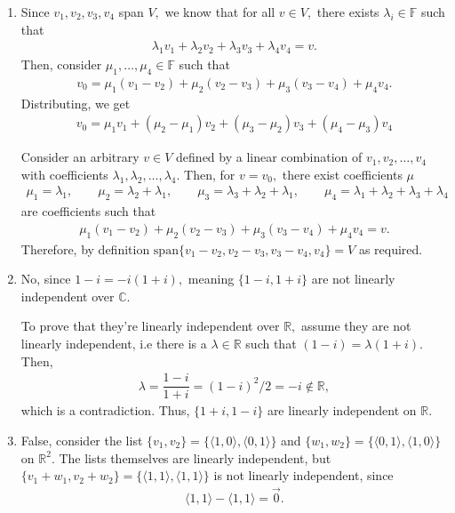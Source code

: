 \documentclass[12pt]{article}
\begin{document}
\begin{enumerate}
  \item Since $v_1, v_2, v_3, v_4$ span $V,$ we know that for all $v
    \in V,$ there exists $\lambda_i \in \mathbb F$ such that
    \begin{align*}
      \lambda_1 v_1 + \lambda_2 v_2 + \lambda_3 v_3 + \lambda_4 v_4 = v.
    \end{align*}
    Then, consider $\mu_1, \ldots, \mu_4 \in \mathbb F$ such that
    \begin{align*}
      v_0 = \mu_1 (v_1 - v_2) + \mu_2(v_2 -v _3) + \mu_3(v_3 - v_4) + \mu_4 v_4.
    \end{align*}
    Distributing, we get
    \begin{align*}
      v_0 = \mu_1 v_1 + (\mu_2 - \mu_1)v_2 + (\mu_3 - \mu_2) v_3 +
      (\mu_4 - \mu_3) v_4
    \end{align*}

    Consider an arbitrary $v \in V$ defined by a linear combination
    of $v_1, v_2, \ldots, v_4$ with coefficients $\lambda_1,
    \lambda_2, \ldots, \lambda_4.$ Then, for $v = v_0,$ there exist
    coefficients $\mu$
    \begin{align*}
      \mu_1 = \lambda_1, \qquad   \mu_2 = \lambda_2 + \lambda_1,
      \qquad \mu_3 = \lambda_3 + \lambda_2 + \lambda_1, \qquad \mu_4
      = \lambda_1 + \lambda_2 + \lambda_3 + \lambda_4
    \end{align*}
    are coefficients such that
    \begin{align*}
      \mu_1(v_1 - v_2)  + \mu_2(v_2 - v_3) + \mu_3 (v_3 - v_4) + \mu_4 v_4 = v.
    \end{align*}
    Therefore, by definition $\text{span}\{v_1 - v_2, v_2 -v_3, v_3 -
    v_4, v_4\} = V$  as required.

  \item No, since $1 - i = -i(1 + i),$ meaning $\{1 - i, 1 + i\}$ are
    not linearly independent over $\mathbb C.$

    To prove that they're linearly independent over $\mathbb R,$
    assume they are not linearly independent, i.e there is a $\lambda
    \in \mathbb R$ such that $(1 - i) = \lambda (1 + i).$ Then,
    \begin{align*}
      \lambda = \dfrac{1 -i}{1 + i} = (1 - i)^2 / 2 = -i \not \in \mathbb R,
    \end{align*}
    which is a contradiction. Thus, $\{1 + i, 1 - i\}$ are linearly
    independent on $\mathbb R.$

  \item False, consider the list $\{v_1, v_2\} = \{\langle 1,
    0\rangle, \langle 0, 1\rangle\}$ and $\{w_1, w_2\} = \{\langle 0,
    1\rangle, \langle 1, 0 \rangle\}$ on $\mathbb R^2.$ The lists
    themselves are linearly independent, but $\{v_1 + w_1, v_2 +
    w_2\} = \{\langle 1, 1 \rangle, \langle 1, 1 \rangle\}$ is not
    linearly independent, since
    \begin{align*}
      \langle 1, 1\rangle - \langle 1, 1\rangle = \vec 0.
    \end{align*}
\end{enumerate}
\end{document}
